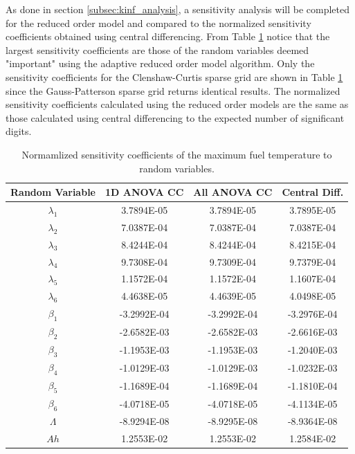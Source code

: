 As done in section \ref{subsec:kinf_analysis}, a sensitivity analysis will be completed for the reduced order model and compared to the normalized sensitivity coefficients obtained using central differencing. From Table \ref{table:pk_sensitivities} notice that the largest sensitivity coefficients are those of the random variables deemed "important" using the adaptive reduced order model algorithm. Only the sensitivity coefficients for the Clenshaw-Curtis sparse grid are shown in Table \ref{table:pk_sensitivities} since the Gauss-Patterson sparse grid returns identical results. The normalized sensitivity coefficients calculated using the reduced order models are the same as those calculated using central differencing to the expected number of significant digits.   
\begin{table}[!htb] 
\caption{\label{table:pk_sensitivities} 
Normamlized sensitivity coefficients of the maximum fuel temperature to random variables.}
\centering
\begin{tabular}{||c|c|c|c||} 
\hline \hline
\textbf{Random Variable} & \textbf{1D ANOVA CC} & \textbf{All ANOVA CC} & \textbf{Central Diff.} \\ \hline
$\lambda_1$  &  3.7894E-05 &  3.7894E-05 &  3.7895E-05 \\ \hline
$\lambda_2$  &  7.0387E-04 &  7.0387E-04 &  7.0387E-04 \\ \hline
$\lambda_3$  &  8.4244E-04 &  8.4244E-04 &  8.4215E-04 \\ \hline
$\lambda_4$  &  9.7308E-04 &  9.7309E-04 &  9.7379E-04 \\ \hline
$\lambda_5$  &  1.1572E-04 &  1.1572E-04 &  1.1607E-04 \\ \hline
$\lambda_6$  &  4.4638E-05 &  4.4639E-05 &  4.0498E-05 \\ \hline
$\beta_1$    & -3.2992E-04 & -3.2992E-04 & -3.2976E-04 \\ \hline
$\beta_2$    & -2.6582E-03 & -2.6582E-03 & -2.6616E-03 \\ \hline
$\beta_3$    & -1.1953E-03 & -1.1953E-03 & -1.2040E-03 \\ \hline
$\beta_4$    & -1.0129E-03 & -1.0129E-03 & -1.0232E-03 \\ \hline
$\beta_5$    & -1.1689E-04 & -1.1689E-04 & -1.1810E-04 \\ \hline
$\beta_6$    & -4.0718E-05 & -4.0718E-05 & -4.1134E-05 \\ \hline
$\Lambda$    & -8.9294E-08 & -8.9295E-08 & -8.9364E-08 \\ \hline
$Ah$         &  1.2553E-02 &  1.2553E-02 &  1.2584E-02 \\ \hline

\end{tabular}
\end{table}
